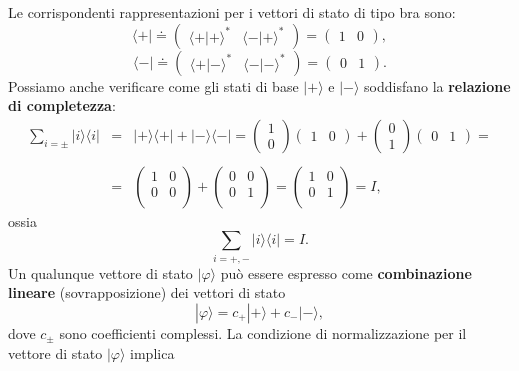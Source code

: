 Le corrispondenti rappresentazioni per i vettori di stato di tipo bra sono:
	\begin{equation}
		\langle + | \doteq
		\begin{pmatrix}
		\langle + | + \rangle ^* & \langle - | + \rangle ^* 
		\end{pmatrix} = 
		\begin{pmatrix}
		1 & 0
		\end{pmatrix} ,
		\end{equation}
		\begin{equation}
		\langle - |  \doteq
		\begin{pmatrix}
		\langle + | - \rangle ^* & \langle - | - \rangle ^* 
		\end{pmatrix} = 
		\begin{pmatrix}
		0 & 1
		\end{pmatrix} .
	\end{equation}
Possiamo anche verificare come gli stati di base $| + \rangle $ e $| - \rangle$ soddisfano la \textbf{relazione di completezza}:
	\begin{eqnarray}
		\sum \limits_{i=\pm} | i \rangle \langle i |  & = & | + \rangle \langle + |  + | - \rangle \langle - |  = 
		\begin{pmatrix}
		1 \\
		0
		\end{pmatrix}
		\begin{pmatrix}
		1 & 0
		\end{pmatrix} + 
		\begin{pmatrix}
		0 \\
		1
		\end{pmatrix}
		\begin{pmatrix}
		0 & 1
		\end{pmatrix}= \nonumber  \\
		\nonumber \\
		& = & \begin{pmatrix}
		1 & 0 \\
		0 & 0 \\
		\end{pmatrix}+
		\begin{pmatrix}
		0 & 0 \\
		0 & 1 \\
		\end{pmatrix}=
		\begin{pmatrix}
		1 & 0 \\
		0 & 1 \\
		\end{pmatrix}=  I  ,
	\end{eqnarray}
ossia
	\begin{equation}
		\boxed{
			\sum \limits_{i=+,-} | i \rangle \langle i | = I .
			}
	\end{equation}
Un qualunque vettore di stato $| \varphi \rangle $ può essere espresso come \textbf{combinazione lineare} (sovrapposizione) dei vettori di stato
	\begin{equation}
		\boxed{
			| \varphi \rangle = c_+ | + \rangle + c_- | - \rangle ,
			}
	\end{equation}
dove $c_{\pm}$ sono coefficienti complessi. La condizione di normalizzazione per il vettore di stato $ | \varphi \rangle $ implica

